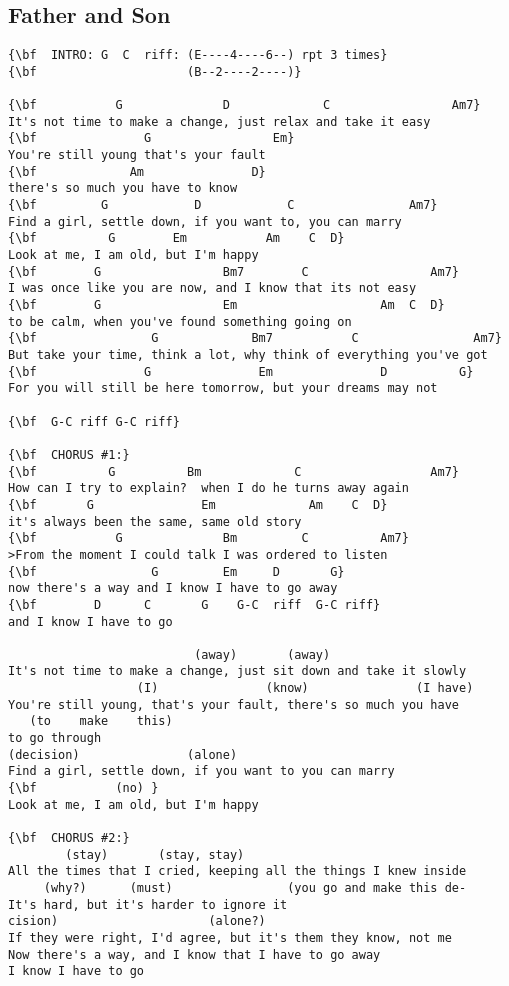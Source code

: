 \documentclass[a4paper]{article}
\begin{document}
\subsection{Father and Son}
\begin{Verbatim}[commandchars=\\\{\}]
{\bf  INTRO: G  C  riff: (E----4----6--) rpt 3 times}
{\bf                     (B--2----2----)}

{\bf           G              D             C                 Am7}
It's not time to make a change, just relax and take it easy
{\bf               G                 Em}
You're still young that's your fault
{\bf             Am               D}
there's so much you have to know
{\bf         G            D            C                Am7}
Find a girl, settle down, if you want to, you can marry
{\bf          G        Em           Am    C  D}
Look at me, I am old, but I'm happy
{\bf        G                 Bm7        C                 Am7}
I was once like you are now, and I know that its not easy
{\bf        G                 Em                    Am  C  D}
to be calm, when you've found something going on
{\bf                G             Bm7           C                Am7}
But take your time, think a lot, why think of everything you've got
{\bf               G               Em               D          G}
For you will still be here tomorrow, but your dreams may not

{\bf  G-C riff G-C riff}

{\bf  CHORUS #1:}
{\bf          G          Bm             C                  Am7}
How can I try to explain?  when I do he turns away again
{\bf       G               Em             Am    C  D}
it's always been the same, same old story
{\bf           G              Bm         C          Am7}
>From the moment I could talk I was ordered to listen
{\bf                G         Em     D       G}
now there's a way and I know I have to go away
{\bf        D      C       G    G-C  riff  G-C riff}
and I know I have to go

                          (away)       (away)
It's not time to make a change, just sit down and take it slowly
                  (I)               (know)               (I have)
You're still young, that's your fault, there's so much you have
   (to    make    this)
to go through
(decision)               (alone)
Find a girl, settle down, if you want to you can marry
{\bf           (no) }
Look at me, I am old, but I'm happy

{\bf  CHORUS #2:}
        (stay)       (stay, stay)
All the times that I cried, keeping all the things I knew inside
     (why?)      (must)                (you go and make this de-
It's hard, but it's harder to ignore it
cision)                     (alone?)
If they were right, I'd agree, but it's them they know, not me
Now there's a way, and I know that I have to go away
I know I have to go

\end{Verbatim}
\newpage
\end{document}

